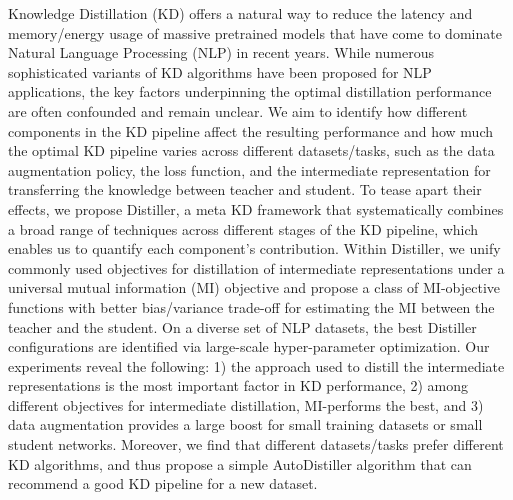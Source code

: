 Knowledge Distillation (KD) offers a natural way to reduce the latency and memory/energy usage of massive  pretrained models that have come to dominate Natural Language Processing (NLP) in recent years. While numerous sophisticated variants of KD algorithms have been proposed for NLP applications, the key factors underpinning the optimal distillation performance are often confounded and remain unclear. We aim to identify how different components in the KD pipeline affect the resulting performance and how much the optimal KD pipeline varies across different datasets/tasks, such as the data augmentation policy, the loss function, and the intermediate representation for transferring the knowledge between teacher and student. To tease apart their effects, we propose Distiller, a meta KD framework that systematically combines a broad range of  techniques across different stages of the KD pipeline, which enables us to quantify each component's contribution. Within Distiller, we unify commonly used objectives for distillation of intermediate representations under a universal mutual information (MI) objective and propose a class of MI-\alpha objective functions with better bias/variance trade-off for estimating the MI between the teacher and the student. On a diverse set of NLP datasets, the best Distiller configurations are identified via large-scale hyper-parameter optimization. Our experiments reveal the following: 1) the approach used to distill the intermediate  representations is the most important factor in KD performance, 2) among different objectives for intermediate distillation, MI-\alpha performs the best, and 3) data augmentation provides a large boost for small training datasets or small student networks. Moreover, we find that different datasets/tasks prefer different KD algorithms, and thus propose a simple AutoDistiller algorithm that can recommend a good KD pipeline for a new dataset.
